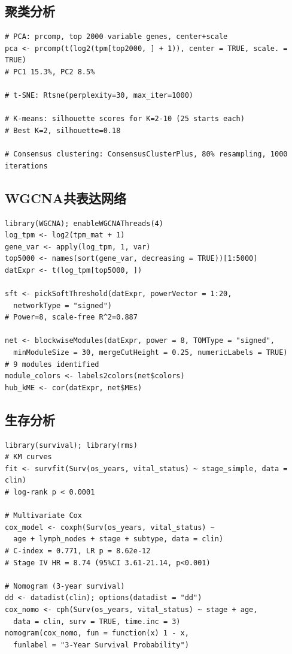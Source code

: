 \documentclass[12pt,a4paper]{ctexart}
\begin{document}
\subsection{聚类分析}
\begin{lstlisting}[caption={06\_clustering.R}, basicstyle=\ttfamily\scriptsize]
# PCA: prcomp, top 2000 variable genes, center+scale
pca <- prcomp(t(log2(tpm[top2000, ] + 1)), center = TRUE, scale. = TRUE)
# PC1 15.3%, PC2 8.5%

# t-SNE: Rtsne(perplexity=30, max_iter=1000)

# K-means: silhouette scores for K=2-10 (25 starts each)
# Best K=2, silhouette=0.18

# Consensus clustering: ConsensusClusterPlus, 80% resampling, 1000 iterations
\end{lstlisting}

\subsection{WGCNA共表达网络}
\begin{lstlisting}[caption={08\_wgcna.R}, basicstyle=\ttfamily\scriptsize]
library(WGCNA); enableWGCNAThreads(4)
log_tpm <- log2(tpm_mat + 1)
gene_var <- apply(log_tpm, 1, var)
top5000 <- names(sort(gene_var, decreasing = TRUE))[1:5000]
datExpr <- t(log_tpm[top5000, ])

sft <- pickSoftThreshold(datExpr, powerVector = 1:20,
  networkType = "signed")
# Power=8, scale-free R^2=0.887

net <- blockwiseModules(datExpr, power = 8, TOMType = "signed",
  minModuleSize = 30, mergeCutHeight = 0.25, numericLabels = TRUE)
# 9 modules identified
module_colors <- labels2colors(net$colors)
hub_kME <- cor(datExpr, net$MEs)
\end{lstlisting}

\subsection{生存分析}
\begin{lstlisting}[caption={11\_survival\_analysis.R}, basicstyle=\ttfamily\scriptsize]
library(survival); library(rms)
# KM curves
fit <- survfit(Surv(os_years, vital_status) ~ stage_simple, data = clin)
# log-rank p < 0.0001

# Multivariate Cox
cox_model <- coxph(Surv(os_years, vital_status) ~
  age + lymph_nodes + stage + subtype, data = clin)
# C-index = 0.771, LR p = 8.62e-12
# Stage IV HR = 8.74 (95%CI 3.61-21.14, p<0.001)

# Nomogram (3-year survival)
dd <- datadist(clin); options(datadist = "dd")
cox_nomo <- cph(Surv(os_years, vital_status) ~ stage + age,
  data = clin, surv = TRUE, time.inc = 3)
nomogram(cox_nomo, fun = function(x) 1 - x,
  funlabel = "3-Year Survival Probability")
\end{lstlisting}
\end{document}
